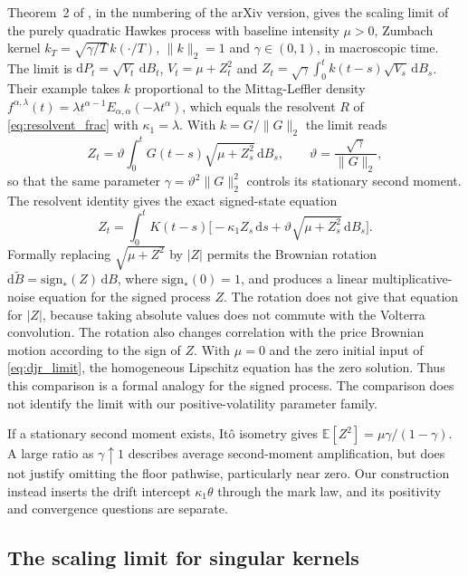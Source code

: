 \documentclass{rQUF2e}
\theoremstyle{plain}
\theoremstyle{definition}
\theoremstyle{remark}
\newcommand{\D}{\mathrm{d}}
\newcommand{\E}{\mathbb{E}}
\begin{document}
Theorem~2 of \citet{DandapaniJusselinRosenbaum2021}, in the numbering of the arXiv version, gives the scaling limit of the purely quadratic Hawkes process with baseline intensity $\mu>0$, Zumbach kernel $k_T=\sqrt{\gamma/T}\,k(\cdot/T)$, $\|k\|_2=1$ and $\gamma\in(0,1)$, in macroscopic time. The limit is $\D P_t=\sqrt{V_t}\,\D B_t$, $V_t=\mu+Z_t^2$ and $Z_t=\sqrt\gamma\int_0^tk(t-s)\sqrt{V_s}\,\D B_s$. Their example takes $k$ proportional to the Mittag-Leffler density $f^{\alpha,\lambda}(t)=\lambda t^{\alpha-1}E_{\alpha,\alpha}(-\lambda t^\alpha)$, which equals the resolvent $R$ of \eqref{eq:resolvent_frac} with $\kappa_1=\lambda$. With $k=G/\|G\|_2$ the limit reads
\begin{equation}\label{eq:djr_limit}
Z_t=\vartheta\int_0^tG(t-s)\sqrt{\mu+Z_s^2}\,\D B_s,\qquad \vartheta=\frac{\sqrt\gamma}{\|G\|_2},
\end{equation}
so that the same parameter $\gamma=\vartheta^2\|G\|_2^2$ controls its stationary second moment. The resolvent identity gives the exact signed-state equation
\begin{equation*}
Z_t=\int_0^tK(t-s)\big[-\kappa_1Z_s\,\D s+\vartheta\sqrt{\mu+Z_s^2}\,\D B_s\big].
\end{equation*}
Formally replacing $\sqrt{\mu+Z^2}$ by $|Z|$ permits the Brownian rotation $\D\widetilde B=\mathrm{sign}_*(Z)\,\D B$, where $\mathrm{sign}_*(0)=1$, and produces a linear multiplicative-noise equation for the signed process $Z$. The rotation does not give that equation for $|Z|$, because taking absolute values does not commute with the Volterra convolution. The rotation also changes correlation with the price Brownian motion according to the sign of $Z$. With $\mu=0$ and the zero initial input of \eqref{eq:djr_limit}, the homogeneous Lipschitz equation has the zero solution. Thus this comparison is a formal analogy for the signed process. The comparison does not identify the limit with our positive-volatility parameter family.

If a stationary second moment exists, It\^o isometry gives $\E[Z^2]=\mu\gamma/(1-\gamma)$. A large ratio as $\gamma\uparrow1$ describes average second-moment amplification, but does not justify omitting the floor pathwise, particularly near zero. Our construction instead inserts the drift intercept $\kappa_1\theta$ through the mark law, and its positivity and convergence questions are separate.

\subsection{The scaling limit for singular kernels}\label{sec:micro_limit}
\end{document}
